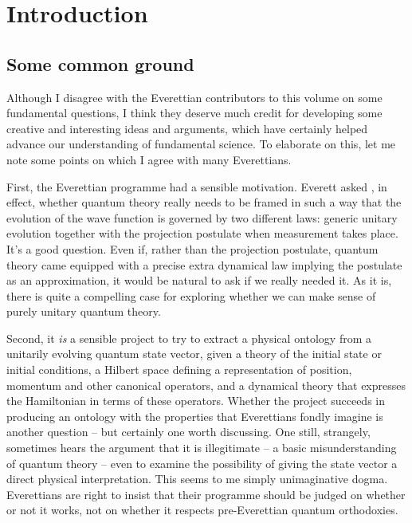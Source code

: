 \documentclass[aps,
pra,epsfig,12pt]{revtex4}
\begin{document}
\section{Introduction}

\subsection{Some common ground}

Although I disagree with the
Everettian contributors to this volume on some fundamental questions, 
I think they deserve much credit for developing some creative
and interesting ideas and arguments, which have
certainly helped advance our understanding of fundamental science. 
To elaborate on this, let me note some points on which I
agree with many Everettians.   

First, the Everettian programme had a sensible motivation.  Everett
asked \cite{everettone}, in effect, whether 
quantum theory really needs to be framed
in such a way that the evolution of the wave function is governed
by two different laws: generic unitary evolution together with the
projection postulate when measurement takes place.  
It's a good question.  Even if, rather than the projection postulate, 
quantum theory came equipped with a precise extra dynamical law
implying the postulate as an approximation, it would be natural to ask
if we really needed it.  As it is, there 
is quite a compelling case for exploring
whether we can make sense of purely unitary quantum theory.

Second, it {\it is} a sensible project to try to extract a physical
ontology from a unitarily evolving quantum state vector, given a
theory of the initial state or initial conditions, a Hilbert space
defining a representation of position, momentum and other canonical
operators, and a dynamical theory that expresses the Hamiltonian in
terms of these operators.  Whether the project succeeds
in producing an ontology with the properties that Everettians
fondly imagine is another question -- but certainly one worth discussing. 
One still, strangely, sometimes hears the argument that it is
illegitimate -- a basic misunderstanding of quantum theory -- even to
examine the possibility of giving the state vector a direct physical
interpretation.  This seems to me simply unimaginative dogma.
Everettians are right to insist that their programme 
should be judged on whether or not it works, not on whether it respects 
pre-Everettian quantum orthodoxies.
\end{document}
